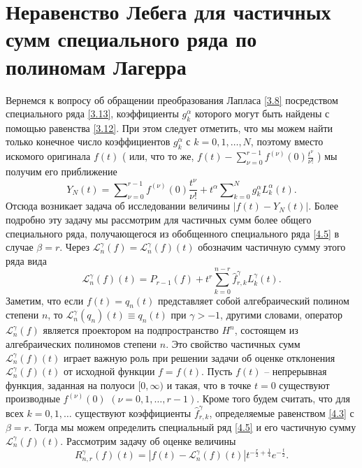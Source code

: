 \section{Неравенство Лебега для частичных сумм специального ряда  по полиномам Лагерра}
Вернемся к вопросу об обращении преобразования Лапласа \eqref{3.8} посредством специального ряда \eqref{3.13}, коэффициенты $g_k^\alpha$ которого могут быть найдены с помощью равенства  \eqref{3.12}. При этом следует отметить, что мы можем найти только конечное число  коэффициентов $g_k^\alpha$ с $k=0,1,\ldots, N$, поэтому вместо искомого оригинала $f(t)$ ( или, что то же, $f(t)-\sum\nolimits_{\nu=0}^{r-1}f^{(\nu)}(0)\frac{t^\nu}{\nu!}$ ) мы получим его приближение
\begin{equation*}
Y_N(t)=\sum\nolimits_{\nu=0}^{r-1}f^{(\nu)}(0)\frac{t^\nu}{\nu!}+t^\alpha\sum\nolimits_{k=0}^{N} g_k^\alpha L_k^\alpha(t).
\end{equation*}
 Отсюда возникает задача об исследовании величины $|f(t)-Y_N(t)|$. Более подробно эту задачу мы рассмотрим для частичных сумм более общего специального ряда, получающегося из обобщенного специального ряда \eqref{4.5}  в случае $\beta=r$. Через $\mathcal{L}_n^\gamma(f)=\mathcal{L}_n^\gamma(f)(t)$ обозначим частичную сумму этого ряда  вида
\begin{equation*}
  \mathcal{L}_n^\gamma(f)(t)=P_{r-1}(f)+t^r\sum\limits_{k=0}^{n-r}\hat{f}_{r,k}^\gamma L_k^\gamma(t).
\end{equation*}
 Заметим, что если $f(t)=q_n(t)$ представляет собой алгебраический полином степени $n$, то
$\mathcal{L}_n^\gamma(q_n)(t)\equiv q_n(t)$ при $\gamma>-1$, другими словами, оператор $\mathcal{L}_n^\gamma(f)$ является проектором на подпространство $H^n$, состоящем из алгебраических полиномов степени $n$.
Это свойство частичных сумм  $\mathcal{L}_n^\gamma(f)(t)$ играет важную роль при решении задачи об оценке отклонения $\mathcal{L}_n^\gamma(f)(t)$ от исходной функции $f=f(t)$. Пусть $f(t)$ -- непрерывная функция, заданная на полуоси $[0,\infty)$ и такая, что в точке $t=0$ существуют производные $f^{(\nu)}(0)$ $(\nu=0,1,\dots,r-1)$. Кроме того будем считать, что для всех $k=0,1,\ldots$ существуют коэффициенты $\hat{f}_{r,k}^\gamma$, определяемые равенством \eqref{4.3} с $\beta=r$. Тогда мы можем определить специальный ряд \eqref{4.5} и его частичную сумму $\mathcal{L}_n^\gamma(f)(t)$. Рассмотрим задачу об оценке величины
\begin{equation}\label{6.1}
  R_{n,r}^\gamma(f)(t)=|f(t)-\mathcal{L}_n^\gamma(f)(t)|t^{-\frac r2+\frac14}e^{-\frac t2}.
\end{equation}
